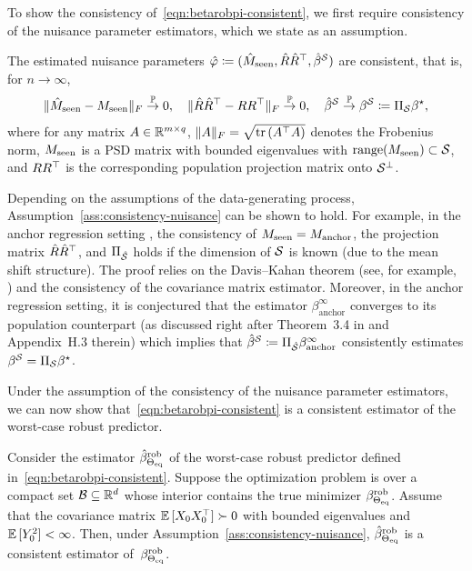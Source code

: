 To show the consistency of~\eqref{eqn:betarobpi-consistent}, we first require consistency of the nuisance parameter estimators, which we state as an assumption.
\begin{assumption}\label{ass:consistency-nuisance}
    The estimated nuisance parameters $\hat\varphi \coloneqq (\hat{M}_{\mathrm{seen}}, \hat{R}\hat{R}^\top, \hat{\beta}^{\mathcal{S}})$ are consistent, that is, for $n \to \infty$,
    \begin{align*}
       \|\hat{M}_{\mathrm{seen}} - M_{\mathrm{seen}}\|_F \stackrel{\mathbb{P}}{\to}0,
        \quad
        \|\hat{R}\hat{R}^\top - RR^\top\|_F \stackrel{\mathbb{P}}{\to}0,
        \quad
        \hat\beta^{\mathcal{S}} \stackrel{\mathbb{P}}{\to} \beta^{\mathcal{S}} \coloneqq \Pi_{\mathcal{S}} \beta^{\star},
    \end{align*}
    where for any matrix $A \in \mathbb{R}^{m \times q}$, $\|A\|_F = \sqrt{\mathrm{tr}\,(A^\top A)}$ denotes the Frobenius norm,  $M_{\mathrm{seen}}$ is a PSD matrix with bounded eigenvalues with $\mathrm{range}(M_{\mathrm{seen}}) \subset \mathcal{S}$, and $RR^\top$ is the corresponding population projection matrix onto $\mathcal{S}^\perp$. 
\end{assumption}
 Depending on the assumptions of the data-generating process, Assumption~\ref{ass:consistency-nuisance} can be shown to hold. For example, in the anchor regression setting \cite{rothenhausler2021anchor}, the consistency of $M_{\mathrm{seen}} = M_{\mathrm{anchor}}$, the projection
matrix $\hat{R}\hat{R}^\top$, and $\Pi_{\hat{\mathcal{S}}}$ holds if the dimension of $\mathcal{S}$ is known (due to the mean shift structure).
The proof relies on the Davis--Kahan theorem (see, for example, \citep{yu2015useful}) and the consistency of the covariance matrix estimator.
Moreover, in the anchor regression setting, it is conjectured that the estimator $\beta^{\infty}_{\mathrm{anchor}}$ converges to its population counterpart (as discussed right after Theorem~3.4 in \citep{jakobsen2022distributional} and Appendix~H.3 therein) which implies that $\hat{\beta}^{\mathcal{S}} \coloneqq \Pi_{\hat{\mathcal{S}}} \beta^{\infty}_{\mathrm{anchor}} $ consistently estimates $\beta^{\mathcal{S}} = \Pi_{\mathcal{S}} \beta^{\star}$.

Under the assumption of the consistency of the nuisance parameter estimators, we can now show that~\eqref{eqn:betarobpi-consistent} is a consistent estimator of the worst-case robust predictor.

\begin{proposition}\label{prop:consistency-predictor}
  Consider the estimator  $\hat{\beta}^{\mathrm{rob}}_{\Theta_{\mathrm{eq}}}$ of the worst-case robust predictor defined in~\eqref{eqn:betarobpi-consistent}. Suppose the optimization problem is over a compact set $\mathcal{B} \subseteq \mathbb{R}^d$ whose interior contains the true minimizer $\beta^{\mathrm{rob}}_{\Theta_{\mathrm{eq}}}$. 
  Assume that the covariance matrix $\mathbb{E}\,[X_0X_0^\top] \succ 0$ with bounded eigenvalues and $\mathbb{E}\,[Y_0^2] < \infty$.
  Then, 
  under Assumption~\ref{ass:consistency-nuisance},
  $\hat{\beta}^{\mathrm{rob}}_{\Theta_{\mathrm{eq}}}$ is a consistent estimator of~$\beta^{\mathrm{rob}}_{\Theta_{\mathrm{eq}}}$.
\end{proposition}

